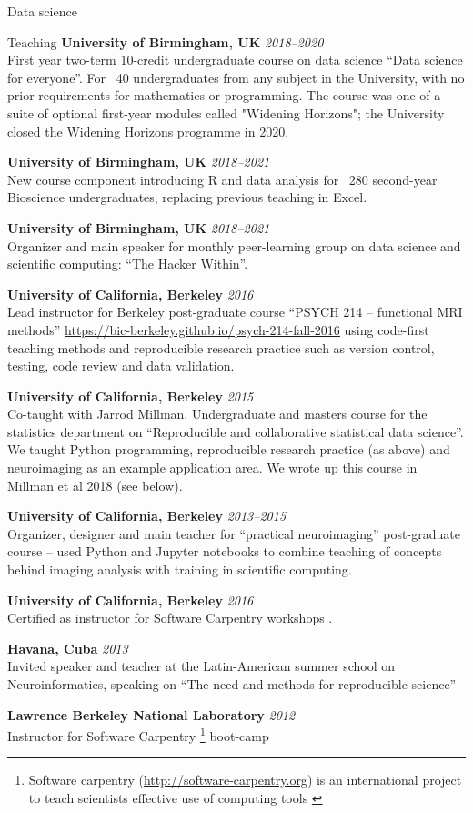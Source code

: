 \documentclass{cv}
\newcommand{\PlaceDateNote}[3]{{\bf #1} \hfill {\em #2} \\#3}
\newcommand{\UoB}{University of Birmingham, UK}
\newcommand{\UCB}{University of California, Berkeley}
\begin{document}
\begin{cvSection}{Data science}
\begin{cvSubSection}{Teaching}
\PlaceDateNote{\UoB}{2018--2020}
    {First year two-term 10-credit undergraduate course on data science ``Data
    science for everyone''.  For ~40 undergraduates from any subject in the
    University, with no prior requirements for mathematics or programming.  The
    course was one of a suite of optional first-year modules called "Widening
    Horizons"; the University closed the Widening Horizons programme in 2020.}

\PlaceDateNote{\UoB}{2018--2021} {New course component introducing R and
    data analysis for ~280 second-year Bioscience undergraduates, replacing
    previous teaching in Excel.}

\PlaceDateNote{\UoB}{2018--2021}
    {Organizer and main speaker for monthly peer-learning group on data science
    and scientific computing: ``The Hacker Within''.}

\PlaceDateNote{\UCB}{2016}
{Lead instructor for Berkeley post-graduate course ``PSYCH 214 -- functional
    MRI methods'' \url{https://bic-berkeley.github.io/psych-214-fall-2016}
    using code-first teaching methods and reproducible research practice such
    as version control, testing, code review and data validation.}

\PlaceDateNote{\UCB}{2015}
{Co-taught with Jarrod Millman.  Undergraduate and masters course for the
    statistics department on ``Reproducible and collaborative statistical data
    science''.  We taught Python programming, reproducible research practice
    (as above) and neuroimaging as an example application area.  We wrote up
    this course in Millman et al 2018 (see below).}

\PlaceDateNote{\UCB}{2013--2015} {Organizer, designer and main teacher for
    ``practical neuroimaging'' post-graduate course -- used Python and Jupyter
    notebooks to combine teaching of concepts behind imaging analysis with
    training in scientific computing.}

\PlaceDateNote{\UCB}{2016} {Certified as instructor for Software Carpentry
    workshops \footref{swc}.}

\PlaceDateNote{Havana, Cuba}{2013} {Invited speaker and teacher at the
    Latin-American summer school on Neuroinformatics, speaking on ``The need
    and methods for reproducible science''}

\PlaceDateNote{Lawrence Berkeley National Laboratory}{2012} {Instructor for
    Software Carpentry \footnote{ Software carpentry
    (\url{http://software-carpentry.org}) is an international project to teach
    scientists effective use of computing tools \label{swc}} boot-camp}


\end{cvSubSection}
\end{cvSection}
\end{document}

